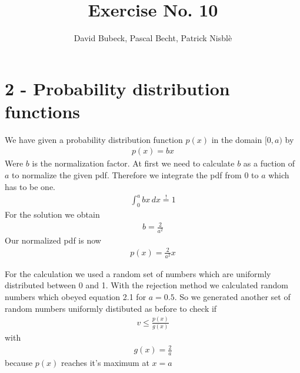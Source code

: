 \documentclass[11pt, a4paper, reqno]{scrartcl}
\begin{document}
    \title{Exercise No. 10}
    \author{David Bubeck, Pascal Becht, Patrick Nisbl\`e}
    \maketitle


    \section*{2 - Probability distribution functions}
   
    	We have given a probability distribution function $p(x)$ in the domain $[0, 		a)$ by
    	\begin{align}
    		p(x) = bx
    	\end{align}
    	Were $b$ is the normalization factor. At first we need to calculate $b$ as 			a fuction of $a$ to normalize the given pdf. Therefore we integrate the pdf 		from $0$ to $a$ which has to be one.
    	\begin{align*}
    		\int_{0}^{a} bx \, dx \overset{!}{=} 1
    	\end{align*}
    	For the solution we obtain
    	\begin{align*}
    		b = \frac{2}{a^2}
    	\end{align*}
    	Our normalized pdf is now
    	\begin{align*}
    		p(x) = \frac{2}{a^2}x
    	\end{align*}
    
     	For the calculation we used a random set of numbers which are uniformly 			distributed between 0 and 1. With the rejection method we calculated 				random numbers which obeyed equation 2.1 for $a = 0.5$. So we generated 			another set of random numbers uniformly distibuted as before to check if
     	\begin{align*}
     		v \leq \frac{p(x)}{g(x)}
     	\end{align*}
     	with
     	\begin{align*}
     		g(x) = \frac{2}{a}
     	\end{align*}
		because $p(x)$ reaches it's maximum at $x = a$
     	
\end{document}
